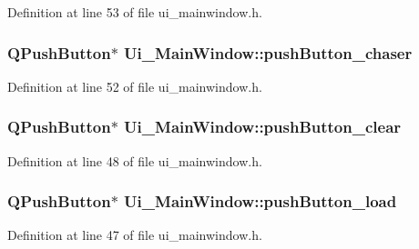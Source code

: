 Definition at line 53 of file ui\+\_\+mainwindow.\+h.

\subsubsection[{\texorpdfstring{push\+Button\+\_\+chaser}{pushButton_chaser}}]{\setlength{\rightskip}{0pt plus 5cm}Q\+Push\+Button$\ast$ Ui\+\_\+\+Main\+Window\+::push\+Button\+\_\+chaser}\hypertarget{class_ui___main_window_a9e8499b7c9a9717499abde993da72ed5}{}\label{class_ui___main_window_a9e8499b7c9a9717499abde993da72ed5}


Definition at line 52 of file ui\+\_\+mainwindow.\+h.

\subsubsection[{\texorpdfstring{push\+Button\+\_\+clear}{pushButton_clear}}]{\setlength{\rightskip}{0pt plus 5cm}Q\+Push\+Button$\ast$ Ui\+\_\+\+Main\+Window\+::push\+Button\+\_\+clear}\hypertarget{class_ui___main_window_a5d7af3b0fdbc605e3fd8ae6ceffa0d29}{}\label{class_ui___main_window_a5d7af3b0fdbc605e3fd8ae6ceffa0d29}


Definition at line 48 of file ui\+\_\+mainwindow.\+h.

\subsubsection[{\texorpdfstring{push\+Button\+\_\+load}{pushButton_load}}]{\setlength{\rightskip}{0pt plus 5cm}Q\+Push\+Button$\ast$ Ui\+\_\+\+Main\+Window\+::push\+Button\+\_\+load}\hypertarget{class_ui___main_window_a67832089879377ce16b3f26fbb2cc3f2}{}\label{class_ui___main_window_a67832089879377ce16b3f26fbb2cc3f2}


Definition at line 47 of file ui\+\_\+mainwindow.\+h.

